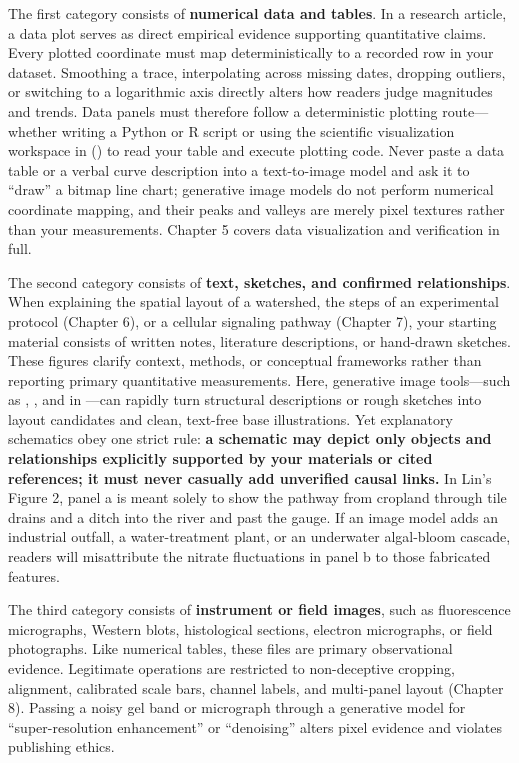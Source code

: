 The first category consists of \textbf{numerical data and tables}. In a research article, a data plot serves as direct empirical evidence supporting quantitative claims. Every plotted coordinate must map deterministically to a recorded row in your dataset. Smoothing a trace, interpolating across missing dates, dropping outliers, or switching to a logarithmic axis directly alters how readers judge magnitudes and trends. Data panels must therefore follow a deterministic plotting route---whether writing a Python or R script or using the scientific visualization workspace in \scidraw{} () to read your table and execute plotting code. Never paste a data table or a verbal curve description into a text-to-image model and ask it to ``draw'' a bitmap line chart; generative image models do not perform numerical coordinate mapping, and their peaks and valleys are merely pixel textures rather than your measurements. Chapter 5 covers data visualization and verification in full.

The second category consists of \textbf{text, sketches, and confirmed relationships}. When explaining the spatial layout of a watershed, the steps of an experimental protocol (Chapter 6), or a cellular signaling pathway (Chapter 7), your starting material consists of written notes, literature descriptions, or hand-drawn sketches. These figures clarify context, methods, or conceptual frameworks rather than reporting primary quantitative measurements. Here, generative image tools---such as , , and  in \scidraw{}---can rapidly turn structural descriptions or rough sketches into layout candidates and clean, text-free base illustrations. Yet explanatory schematics obey one strict rule: \textbf{a schematic may depict only objects and relationships explicitly supported by your materials or cited references; it must never casually add unverified causal links.} In Lin's Figure 2, panel a is meant solely to show the pathway from cropland through tile drains and a ditch into the river and past the gauge. If an image model adds an industrial outfall, a water-treatment plant, or an underwater algal-bloom cascade, readers will misattribute the nitrate fluctuations in panel b to those fabricated features.

The third category consists of \textbf{instrument or field images}, such as fluorescence micrographs, Western blots, histological sections, electron micrographs, or field photographs. Like numerical tables, these files are primary observational evidence. Legitimate operations are restricted to non-deceptive cropping, alignment, calibrated scale bars, channel labels, and multi-panel layout (Chapter 8). Passing a noisy gel band or micrograph through a generative model for ``super-resolution enhancement'' or ``denoising'' alters pixel evidence and violates publishing ethics.

